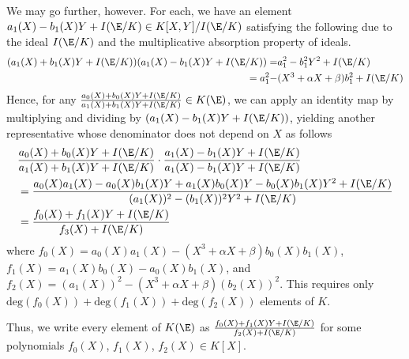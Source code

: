 \documentclass[11pt,letterpaper]{article}
\newcommand{\polys}{K[X,Y]}
\theoremstyle{definition}
\newcommand{\6}{\mathbf}
\newcommand{\7}{\mathcal}
\begin{document}
We may go further, however. For each, we have an element $a_1(X) - b_1(X)Y + I(\E/K) \in \polys/I(\E/K)$ satisfying the following due to the ideal $I(\E/K)$ and the multiplicative absorption property of ideals.
\begin{align}
(a_1(X) + b_1(X)Y + I(\E/K))(a_1(X) - b_1(X)Y + I(\E/K)) =& a_1^2 - b_1^2Y^2 + I(\E/K) \\
= a_1^2 - &(X^3 + \alpha X + \beta)b_1^2 + I(\E/K)
\end{align}
Hence, for any $\frac{a_0(X)+b_0(X)Y + I(\E/K)}{a_1(X)+b_1(X)Y + I(\E/K)} \in K(\E)$, we can apply an identity map by multiplying and dividing by $(a_1(X) - b_1(X)Y + I(\E/K))$, yielding another representative whose denominator does not depend on $X$ as follows
\begin{align}
& \frac{a_0(X)+b_0(X)Y + I(\E/K)}{a_1(X)+b_1(X)Y + I(\E/K)} \cdot \frac{a_1(X)-b_1(X)Y + I(\E/K)}{a_1(X)-b_1(X)Y + I(\E/K)} \\ &= \frac{a_0(X)a_1(X) - a_0(X) b_1(X) Y + a_1(X)b_0(X) Y - b_0(X) b_1(X) Y^2 + I(\E/K)}{(a_1(X))^2 - (b_1(X))^2Y^2 + I(\E/K)} \\
&= \frac{f_0(X) + f_1(X)Y + I(\E/K)}{f_3(X) + I(\E/K)}
\end{align} where $f_0(X) = a_0(X) a_1(X) - (X^3 + \alpha X + \beta)b_0(X)b_1(X)$, $f_1(X) = a_1(X)b_0(X) - a_0(X) b_1(X)$, and $f_2(X) = (a_1(X))^2 - (X^3 + \alpha X + \beta)(b_2(X))^2$. This requires only $\text{deg}(f_0(X))+\text{deg}(f_1(X))+\text{deg}(f_2(X))$ elements of $K$.

Thus, we write every element of $K(\E)$ as $\frac{f_0(X) + f_1(X)Y + I(\E/K)}{f_2(X) + I(\E/K)}$ for some polynomials $f_0(X)$, $f_1(X)$, $f_2(X) \in K[X]$.
\end{document}
